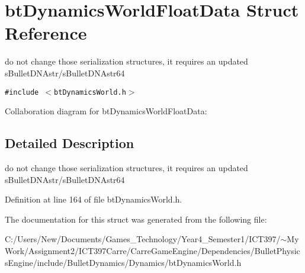\hypertarget{structbt_dynamics_world_float_data}{
\section{btDynamicsWorldFloatData Struct Reference}
\label{structbt_dynamics_world_float_data}
}
do not change those serialization structures, it requires an updated sBulletDNAstr/sBulletDNAstr64  


{\tt \#include $<$btDynamicsWorld.h$>$}

Collaboration diagram for btDynamicsWorldFloatData:

\subsection{Detailed Description}
do not change those serialization structures, it requires an updated sBulletDNAstr/sBulletDNAstr64 

Definition at line 164 of file btDynamicsWorld.h.

The documentation for this struct was generated from the following file:\begin{CompactItemize}
\item 
C:/Users/New/Documents/Games\_\-Technology/Year4\_\-Semester1/ICT397/$\sim$My Work/Assignment2/ICT397Carre/CarreGameEngine/Dependencies/BulletPhysicsEngine/include/BulletDynamics/Dynamics/btDynamicsWorld.h\end{CompactItemize}
